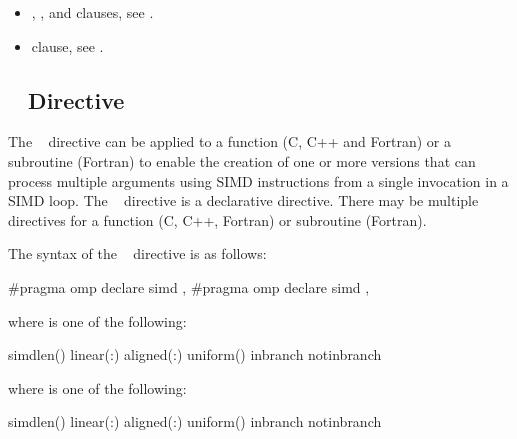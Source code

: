\crossreferences
\begin{itemize}
\item {}, ,  and  clauses, see
.

\item {} clause, see .
\end{itemize}








\subsection{~ Directive}
\label{subsec:declare simd Directive}
\summary
The ~ directive can be applied to a function (C, C++ and Fortran) or a
subroutine (Fortran) to enable the creation of one or more versions that can process
multiple arguments using SIMD instructions from a single invocation in a SIMD
loop. The ~ directive is a declarative directive. There may be multiple
~ directives for a function (C, C++, Fortran) or subroutine (Fortran).

\syntax
The syntax of the ~ directive is as follows:

\begin{ccppspecific}
\begin{ompcPragma}
#pragma omp declare simd \plc{[clause[ [},\plc{] clause] ... ] new-line}
\plc{[}#pragma omp declare simd \plc{[clause[ [},\plc{] clause] ... ] new-line]}
\plc{[ ... ]}
\end{ompcPragma}

where  is one of the following:

\begin{indentedcodelist}
simdlen()
linear(\plc{linear-list[ }:\plc{ linear-step]})
aligned(\plc{argument-list[ }:\plc{ alignment]})
uniform()
inbranch
notinbranch
\end{indentedcodelist}
\end{ccppspecific}


\begin{fortranspecific}

where  is one of the following:
\begin{indentedcodelist}
simdlen()
linear(\plc{linear-list[ }:\plc{ linear-step]})
aligned(\plc{argument-list[ }:\plc{ alignment]})
uniform()
inbranch
notinbranch
\end{indentedcodelist}
\end{fortranspecific}


